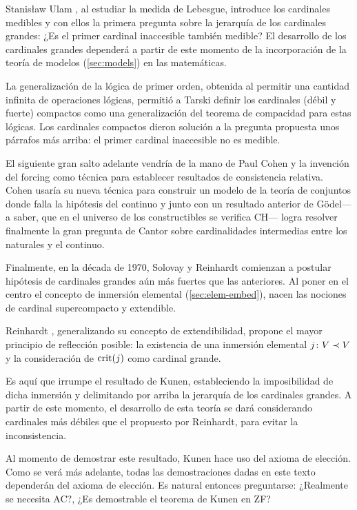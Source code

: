 \documentclass
[
  12pt,
  letterpaper,
  openany,
  oneside,
]{book}
\begin{document}
Stanisław Ulam \autocite{ulam_zur_1930}, al estudiar la medida de Lebesgue,
introduce los cardinales medibles y con ellos la primera
pregunta sobre la jerarquía de los cardinales grandes:
¿Es el primer cardinal inaccesible también medible?
El desarrollo de los cardinales grandes dependerá a partir de este
momento de la incorporación de la teoría de modelos (\ref{sec:models}) en las matemáticas.

La generalización de la lógica de primer orden, obtenida al
permitir una cantidad infinita de operaciones lógicas,
permitió a Tarski \autocite{tarski_problems_1966} definir los cardinales (débil y fuerte)
compactos como una generalización del teorema de compacidad
para estas lógicas. Los cardinales compactos dieron solución
a la pregunta propuesta unos párrafos más arriba:
el primer cardinal inaccesible no es medible.

El siguiente gran salto adelante vendría de la mano de
Paul Cohen \autocite{cohen_independence_1963,cohen_independence_1964}
y la invención del forcing como técnica
para establecer resultados de consistencia relativa.
Cohen usaría su nueva técnica para construir un modelo de la
teoría de conjuntos donde falla la hipótesis del continuo
y junto con un resultado anterior de Gödel---a saber, que
en el universo de los constructibles se verifica CH---%
logra resolver finalmente la gran pregunta de Cantor sobre cardinalidades
intermedias entre los naturales y el continuo.

Finalmente, en la década de 1970,
Solovay y Reinhardt comienzan a postular
hipótesis de cardinales grandes aún más fuertes
que las anteriores.
Al poner en el centro el concepto de inmersión elemental
(\ref{sec:elem-embed}),
nacen las nociones de cardinal supercompacto y extendible.

Reinhardt \autocite{reinhardt_ackermanns_1970},
generalizando su concepto de extendibilidad,
propone el mayor principio de reflección posible:
la existencia de una inmersión elemental $j\colon V\prec V$
y la consideración de $\operatorname{crit} (j)$ como cardinal grande.

Es aquí que irrumpe el resultado de Kunen,
estableciendo la imposibilidad de dicha inmersión
y delimitando por arriba la jerarquía de los cardinales
grandes. A partir de este momento, el desarrollo
de esta teoría se dará considerando cardinales más
débiles que el propuesto por Reinhardt,
para evitar la inconsistencia.

Al momento de demostrar este resultado, Kunen hace
uso del axioma de elección. Como se verá
más adelante, todas las demostraciones dadas en este texto
dependerán del axioma de elección.
Es natural entonces preguntarse: ¿Realmente se necesita AC?,
¿Es demostrable el teorema de Kunen en ZF?
\end{document}
